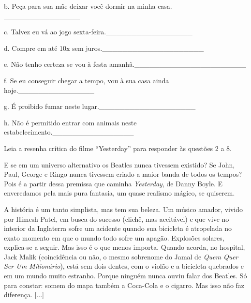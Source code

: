 {b. Peça para sua mãe deixar você dormir na minha casa.
\_\_\_\_\_\_\_\_\_\_\_\_\_\_\_

c. Talvez eu vá ao jogo sexta-feira.\_\_\_\_\_\_\_\_\_\_\_\_\_\_\_\_\_

d. Compre em até 10x sem juros.\_\_\_\_\_\_\_\_\_\_\_\_\_\_\_\_\_\_\_\_

e. Não tenho certeza se vou à festa
amanhã.\_\_\_\_\_\_\_\_\_\_\_\_\_\_\_\_\_\_\_\_\_\_

f. Se eu conseguir chegar a tempo, vou à sua casa ainda
hoje.\_\_\_\_\_\_\_\_\_\_\_\_\_\_\_

g. É proibido fumar neste lugar.\_\_\_\_\_\_\_\_\_\_\_\_\_\_\_\_\_\_\_

h. Não é permitido entrar com animais neste
estabelecimento.\_\_\_\_\_\_\_\_\_\_\_\_\_\_\_\_


Leia a resenha crítica do filme ``Yesterday'' para responder às questões
2 a 8.

E se em um universo alternativo os Beatles nunca tivessem existido? Se
John, Paul, George e Ringo nunca tivessem criado a maior banda de todos
os tempos? Pois é a partir dessa premissa que caminha \emph{Yesterday},
de Danny Boyle. E enveredamos pela mais pura fantasia, um quase realismo
mágico, se quiserem.

A história é um tanto simplista, mas tem sua beleza. Um músico amador,
vivido por Himesh Patel, em busca do sucesso (clichê, mas aceitável) e
que vive no interior da Inglaterra sofre um acidente quando sua
bicicleta é atropelada no exato momento em que o mundo todo sofre um
apagão. Explosões solares, explica-se a seguir. Mas isso é o que menos
importa. Quando acorda, no hospital, Jack Malik (coincidência ou não, o
mesmo sobrenome do Jamal de \emph{Quem Quer Ser Um Milionário}), está
sem dois dentes, com o violão e a bicicleta quebrados e em um mundo
muito estranho. Porque ninguém nunca ouviu falar dos Beatles. Só para
constar: somem do mapa também a Coca-Cola e o cigarro. Mas isso não faz
diferença. {[}...{]}

}
